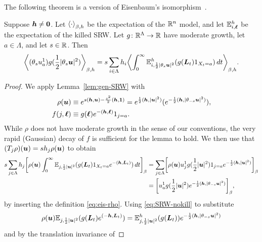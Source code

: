 \documentclass[11pt,a4paper]{article}
\begin{document}
The following theorem is a version of Eisenbaum's isomorphism~\cite{MR1459468}.
\begin{theorem}
  \label{thm:eucl-eis}
  Suppose $\boldsymbol{h}\neq \boldsymbol{0}$. Let $\spin{\cdot}_{\beta,h}$ be the
  expectation of the $\mathbb{R}^n$ model, and let $\mathbb{E}_{i,\boldsymbol{\ell}}^h$ be the
  expectation of the killed SRW.  Let $g\colon\mathbb{R}^{\Lambda}\to \mathbb{R}$ have
  moderate growth, let $a\in\Lambda$, and let $s\in\mathbb{R}$. Then
  \begin{equation}
    \label{eq:EIS-g}
    \spin{(\theta_{s}u_{a}^{1})g(\frac{1}{2}|\theta_{s}\V{u}|^{2})}_{\beta,h} 
    =
    s\sum_{i\in\Lambda}h_{i}\spin{ \int_{0}^{\infty}
      \E^{h}_{i,\frac{1}{2}|\theta_{s}\V{u}|^{2}}(g(\V{L}_{t})1_{X_{t}=a}) \, dt}_{\beta,h}.
  \end{equation}
\end{theorem}
\begin{proof}
 We apply Lemma~\ref{lem:gen-SRW} with
  \begin{align}
    \label{eq:eis-rho}
      \rho(\boldsymbol{u}) 
      &\equiv e^{s(\boldsymbol{h},\boldsymbol{u}) - \frac{s^2}{2}(\boldsymbol{h},\boldsymbol{1})} =
        e^{\frac{1}{2}(\boldsymbol{h},|\boldsymbol{u}|^2)}
        (e^{-\frac{1}{2}(\boldsymbol{h},|\theta_{-s}\boldsymbol{u}|^2)}), \\
      f(j,\boldsymbol{\ell}) &\equiv
      g(\boldsymbol{\ell})e^{-(\boldsymbol{h},\boldsymbol{\ell})} 1_{j=a}.
  \end{align}
  While $\rho$ does not have moderate growth in the sense of our
  conventions, the very rapid (Gaussian) decay of $f$ is sufficient
  for the lemma to hold. We then
  use that $(T_j\rho)(\boldsymbol{u}) = sh_j \rho(\boldsymbol{u})$ to obtain
  \begin{align}
    \label{eq:flat-eis-1}
      s\sum_{j\in\Lambda} h_j\uspin{\rho(\V{u})\int_0^\infty
        \E_{j,\frac{1}{2}|\V{u}|^2}(
        g(\V{L}_t)1_{X_{t}=a}e^{-(\V{h},\V{L}_t)})\,dt}_{\beta} 
      &=
      \sum_{j\in\Lambda}\uspin{\rho(\V{u})u_{j}^{1} 
        g(\frac{1}{2} |\V{u}|^{2}) 1_{j=a}
        e^{-\frac{1}{2}(\V{h},|\V{u}|^2)}}_{\beta}
      \nnb
      &= 
      \uspin{u_{a}^{1} 
        g(\frac{1}{2} |\V{u}|^{2})e^{-\frac{1}{2}(\V{h},|\theta_{-s}\V{u}|^2)}}_{\beta},
  \end{align}
  by inserting the definition \eqref{eq:eis-rho}.
  Using \eqref{eq:SRW-nokill} to substitute
  \begin{equation}
    \rho(\boldsymbol{u})\mathbb{E}_{j,\frac{1}{2}|\boldsymbol{u}|^2}(g(\boldsymbol{L}_t)e^{(-\boldsymbol{h},\boldsymbol{L}_t)}) 
    = \mathbb{E}_{j,\frac{1}{2}|\boldsymbol{u}|^2}^h(g(\boldsymbol{L}_t))e^{-\frac{1}{2}(\boldsymbol{h},|\theta_{-s}\boldsymbol{u}|^2)}
  \end{equation}
  and by the translation invariance of

\end{proof}
\end{document}
